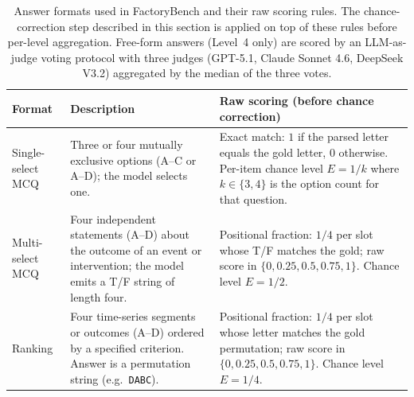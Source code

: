 \documentclass{article}
\begin{document}
\begin{table}[htbp]
    \centering
    \caption{Answer formats used in FactoryBench and their raw scoring rules. The chance-correction step described in this section is applied on top of these rules before per-level aggregation. Free-form answers (Level~4 only) are scored by an LLM-as-judge voting protocol with three judges (GPT-5.1, Claude Sonnet 4.6, DeepSeek V3.2) aggregated by the median of the three votes.}
    \label{tab:answer_formats}
    \small
    \setlength{\tabcolsep}{4pt}
    \begin{tabular}{@{}l p{4.6cm} p{6.2cm}@{}}
        \toprule
        \textbf{Format}   & \textbf{Description}                                                                                                                 & \textbf{Raw scoring (before chance correction)}                                                                                                                                                                                                                                                                          \\
        \midrule
        Single-select MCQ & Three or four mutually exclusive options (A--C or A--D); the model selects one.                                                      & Exact match: $1$ if the parsed letter equals the gold letter, $0$ otherwise. Per-item chance level $E=1/k$ where $k\in\{3,4\}$ is the option count for that question.                                                                                                                                                    \\
        \addlinespace
        Multi-select MCQ  & Four independent statements (A--D) about the outcome of an event or intervention; the model emits a T/F string of length four.       & Positional fraction: $1/4$ per slot whose T/F matches the gold; raw score in $\{0, 0.25, 0.5, 0.75, 1\}$. Chance level $E=1/2$.                                                                                                                                                                                          \\
        \addlinespace
        Ranking           & Four time-series segments or outcomes (A--D) ordered by a specified criterion. Answer is a permutation string (e.g.\ \texttt{DABC}). & Positional fraction: $1/4$ per slot whose letter matches the gold permutation; raw score in $\{0, 0.25, 0.5, 0.75, 1\}$. Chance level $E=1/4$.                                                                                                                                                                           \\

\end{tabular}
\end{table}
\end{document}
